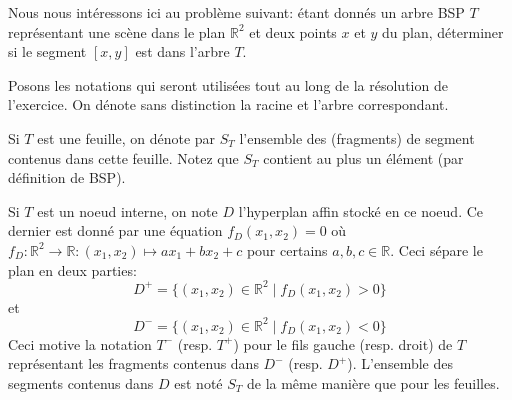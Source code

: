 
Nous nous intéressons ici au problème suivant: étant donnés
un arbre BSP $T$ représentant une scène dans le plan $\mathbb{R}^2$
et deux points $x$ et $y$ du plan, déterminer si le segment $[x, y]$
est dans l'arbre $T$.

Posons les notations qui seront utilisées tout au long de la
résolution de l'exercice. On dénote sans distinction la racine et
l'arbre correspondant.

Si $T$ est une feuille, on dénote par $S_T$ l'ensemble des (fragments)
de segment contenus dans cette feuille.
Notez que $S_T$ contient au plus un élément (par définition de BSP).

Si $T$ est un noeud interne, on note $D$ l'hyperplan affin stocké
en ce noeud. Ce dernier est donné par une équation $f_D(x_1, x_2) = 0$
où $f_D: \mathbb{R}^2 \to \mathbb{R}: (x_1, x_2)\mapsto a x_1 + b x_2 +c$
pour certains $a, b, c\in\mathbb{R}$. Ceci sépare le plan en deux
parties: $$D^+=\{(x_1, x_2)\in\mathbb{R}^2\mid f_D(x_1, x_2) > 0\}$$ et
$$D^-=\{(x_1, x_2)\in\mathbb{R}^2\mid f_D(x_1, x_2) < 0\}$$
Ceci motive la notation $T^-$ (resp. $T^+$) pour le fils gauche
(resp. droit) de $T$ représentant les fragments contenus dans $D^-$
(resp. $D^+$). L'ensemble des segments contenus dans $D$ est noté
$S_T$ de la même manière que pour les feuilles.
